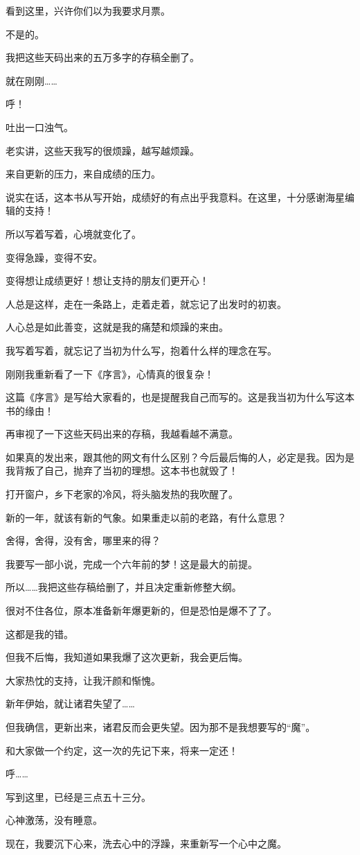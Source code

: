\begin{this_body}
看到这里，兴许你们以为我要求月票。

不是的。

我把这些天码出来的五万多字的存稿全删了。

就在刚刚……

呼！

吐出一口浊气。

老实讲，这些天我写的很烦躁，越写越烦躁。

来自更新的压力，来自成绩的压力。

说实在话，这本书从写开始，成绩好的有点出乎我意料。在这里，十分感谢海星编辑的支持！

所以写着写着，心境就变化了。

变得急躁，变得不安。

变得想让成绩更好！想让支持的朋友们更开心！

人总是这样，走在一条路上，走着走着，就忘记了出发时的初衷。

人心总是如此善变，这就是我的痛楚和烦躁的来由。

我写着写着，就忘记了当初为什么写，抱着什么样的理念在写。

刚刚我重新看了一下《序言》，心情真的很复杂！

这篇《序言》是写给大家看的，也是提醒我自己而写的。这是我当初为什么写这本书的缘由！

再审视了一下这些天码出来的存稿，我越看越不满意。

如果真的发出来，跟其他的网文有什么区别？今后最后悔的人，必定是我。因为是我背叛了自己，抛弃了当初的理想。这本书也就毁了！

打开窗户，乡下老家的冷风，将头脑发热的我吹醒了。

新的一年，就该有新的气象。如果重走以前的老路，有什么意思？

舍得，舍得，没有舍，哪里来的得？

我要写一部小说，完成一个六年前的梦！这是最大的前提。

所以……我把这些存稿给删了，并且决定重新修整大纲。

很对不住各位，原本准备新年爆更新的，但是恐怕是爆不了了。

这都是我的错。

但我不后悔，我知道如果我爆了这次更新，我会更后悔。

大家热忱的支持，让我汗颜和惭愧。

新年伊始，就让诸君失望了……

但我确信，更新出来，诸君反而会更失望。因为那不是我想要写的“魔”。

和大家做一个约定，这一次的先记下来，将来一定还！

呼……

写到这里，已经是三点五十三分。

心神激荡，没有睡意。

现在，我要沉下心来，洗去心中的浮躁，来重新写一个心中之魔。

\end{this_body}

